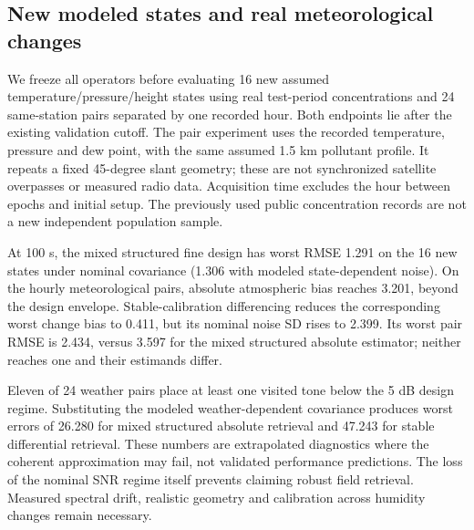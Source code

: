 \subsection{New modeled states and real meteorological changes}
We freeze all operators before evaluating 16 new assumed temperature/pressure/height states using real test-period concentrations and 24 same-station pairs separated by one recorded hour. Both endpoints lie after the existing validation cutoff. The pair experiment uses the recorded temperature, pressure and dew point, with the same assumed 1.5 km pollutant profile. It repeats a fixed 45-degree slant geometry; these are not synchronized satellite overpasses or measured radio data. Acquisition time excludes the hour between epochs and initial setup. The previously used public concentration records are not a new independent population sample.

At 100 s, the mixed structured fine design has worst RMSE 1.291 on the 16 new states under nominal covariance (1.306 with modeled state-dependent noise). On the hourly meteorological pairs, absolute atmospheric bias reaches 3.201, beyond the design envelope. Stable-calibration differencing reduces the corresponding worst change bias to 0.411, but its nominal noise SD rises to 2.399. Its worst pair RMSE is 2.434, versus 3.597 for the mixed structured absolute estimator; neither reaches one and their estimands differ.

Eleven of 24 weather pairs place at least one visited tone below the 5 dB design regime. Substituting the modeled weather-dependent covariance produces worst errors of 26.280 for mixed structured absolute retrieval and 47.243 for stable differential retrieval. These numbers are extrapolated diagnostics where the coherent approximation may fail, not validated performance predictions. The loss of the nominal SNR regime itself prevents claiming robust field retrieval. Measured spectral drift, realistic geometry and calibration across humidity changes remain necessary.

